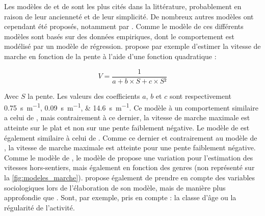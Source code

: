 Les modèles de \textcite{Tobler1993} et de 
sont les plus cités dans la littérature, probablement en raison de
leur ancienneté et de leur simplicité. De nombreux autres modèles ont
cependant été proposés, notamment par
\textcite{Rees2004,Irmischer2017,Kerouanton2020}. Comme le modèle de
\textcite{Tobler1993} ces différents modèles sont basés sur des
données empiriques, dont le comportement est modélisé par un modèle de
régression. \textcite{Rees2004} propose par exemple d'estimer la
vitesse de marche en fonction de la pente à l'aide d'une fonction
quadratique :

\begin{equation}
  V = \dfrac{1}{a + b × S + c × S²}
\end{equation}

Avec \(S\) la pente. Les valeurs des coefficients \(a\), \(b\) et
\(c\) sont respectivement
\SIlist{0,75;0,09;14,6}{\second\per\meter}. Ce modèle à un
comportement similaire a celui de \textcite{Tobler1993}, mais
contrairement à ce dernier, la vitesse de marche maximale est atteinte
sur le plat et non sur une pente faiblement négative. Le modèle de
\textcite{Irmischer2017} est également similaire à celui de
\textcite{Tobler1993}. Comme ce dernier et contrairement au modèle de
\textcite{Rees2004}, la vitesse de marche maximale est atteinte pour
une pente faiblement négative. Comme le modèle de
\textcite{Tobler1993}, le modèle de \textcite{Irmischer2017} propose
une variation pour l'estimation des vitesses hors-sentiers, mais
également en fonction des genres (non représenté sur la
\autoref{fig:modeles_marche}). \textcite{Kerouanton2020} propose
également de prendre en compte des variables sociologiques lors de
l'élaboration de son modèle, mais de manière plus approfondie que
\textcite{Irmischer2017}. Sont, par exemple, pris en compte : la
classe d'âge ou la régularité de l'activité.

